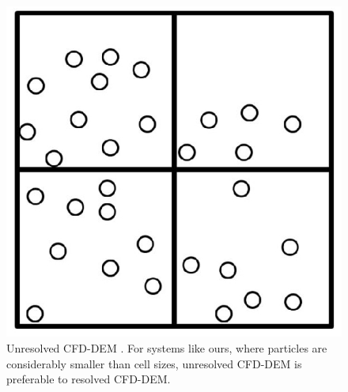 \begin{figure}[!htb]
\centering
\includegraphics[width=.30\columnwidth]{images/130unresolvedcfddem}
\caption[Unresolved CFD-DEM]{Unresolved CFD-DEM \cite{RefWorks:208}. For
systems like ours, where particles are considerably smaller than cell sizes,
unresolved CFD-DEM is preferable to resolved CFD-DEM.}
\label{fig:130unresolvedcfddem}
\end{figure}